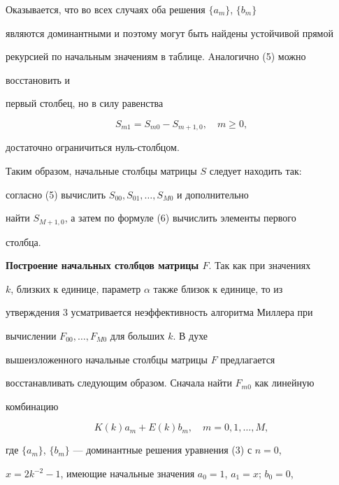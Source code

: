  


Оказывается, что во всех случаях оба решения $\{a_m\}$, $\{b_m\}$ 


являются доминантными и поэтому могут быть найдены устойчивой прямой 


рекурсией по начальным значениям в таблице. Aналогично (5) можно 


восстановить и 


первый столбец, но в силу равенства 


\begin{equation} 


S_{m1}=S_{m0}-S_{m+1,0},\quad m\ge 0, 


\end{equation} 


достаточно ограничиться нуль-столбцом. 


 


Таким образом, начальные столбцы матрицы $S$ следует находить так: 


согласно (5) вычислить $S_{00},S_{01},\dotsc,S_{M0}$ и дополнительно 


найти $S_{M+1,0}$, а затем по формуле (6) вычислить элементы первого 


столбца. 


\medskip 


 


{\bf Построение начальных столбцов матрицы $F$}. Так как при значениях 


$k$, близких к единице, параметр $\alpha$ также близок к единице, то из 


утверждения 3 усматривается неэффективность алгоритма Миллера при 


вычислении $F_{00},\dotsc,F_{M0}$ для больших $k$. В духе 


вышеизложенного начальные столбцы матрицы $F$ предлагается 


восстанавливать следующим образом. Сначала найти $F_{m0}$ как линейную 


комбинацию 


\begin{equation} 


K(k)a_m+E(k)b_m,\quad m=0,1,\dotsc,M, 


\end{equation} 


где $\{a_m\}$, $\{b_m\}$ --- доминантные решения уравнения (3) с $n=0$, 


$x=2k^{-2}-1$, имеющие начальные значения $a_0=1$, $a_1=x$; $b_0=0$, 


